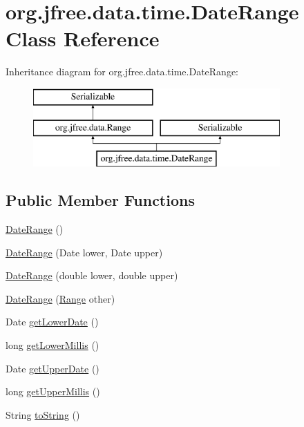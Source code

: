 \hypertarget{classorg_1_1jfree_1_1data_1_1time_1_1_date_range}{}\section{org.\+jfree.\+data.\+time.\+Date\+Range Class Reference}
\label{classorg_1_1jfree_1_1data_1_1time_1_1_date_range}
Inheritance diagram for org.\+jfree.\+data.\+time.\+Date\+Range\+:\begin{figure}[H]
\begin{center}
\leavevmode
\includegraphics[height=3.000000cm]{classorg_1_1jfree_1_1data_1_1time_1_1_date_range}
\end{center}
\end{figure}
\subsection*{Public Member Functions}
\begin{DoxyCompactItemize}
\item 
\mbox{\hyperlink{classorg_1_1jfree_1_1data_1_1time_1_1_date_range_a1d324cdda5f4d0e8c18acc2397047a6c}{Date\+Range}} ()
\item 
\mbox{\hyperlink{classorg_1_1jfree_1_1data_1_1time_1_1_date_range_a11b3a1f3142cbbaf826bb4483fbbdd9b}{Date\+Range}} (Date lower, Date upper)
\item 
\mbox{\hyperlink{classorg_1_1jfree_1_1data_1_1time_1_1_date_range_a00c28e49796a187e21661228eb0a1e4e}{Date\+Range}} (double lower, double upper)
\item 
\mbox{\hyperlink{classorg_1_1jfree_1_1data_1_1time_1_1_date_range_ad7605619fcbc2ef82511778604611baa}{Date\+Range}} (\mbox{\hyperlink{classorg_1_1jfree_1_1data_1_1_range}{Range}} other)
\item 
Date \mbox{\hyperlink{classorg_1_1jfree_1_1data_1_1time_1_1_date_range_a81157ae9e57975ecb7e167ba7678ff97}{get\+Lower\+Date}} ()
\item 
long \mbox{\hyperlink{classorg_1_1jfree_1_1data_1_1time_1_1_date_range_a8ab817de415731da19c92aa498d62f33}{get\+Lower\+Millis}} ()
\item 
Date \mbox{\hyperlink{classorg_1_1jfree_1_1data_1_1time_1_1_date_range_a9b87175cf0549cce3e213c8041e174f8}{get\+Upper\+Date}} ()
\item 
long \mbox{\hyperlink{classorg_1_1jfree_1_1data_1_1time_1_1_date_range_a1b32b3932522d445ff0942baa23f1abb}{get\+Upper\+Millis}} ()
\item 
String \mbox{\hyperlink{classorg_1_1jfree_1_1data_1_1time_1_1_date_range_a2e5075ba7dbb42c3e51d52d30500de64}{to\+String}} ()
\end{DoxyCompactItemize}
